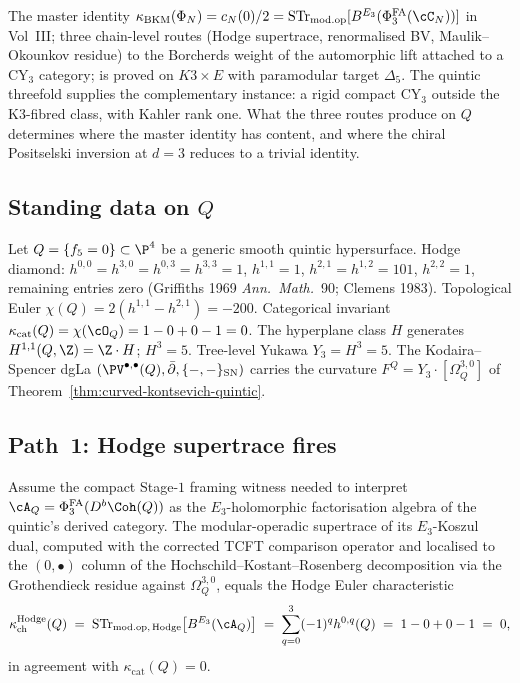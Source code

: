 The master identity $\kappa_{\mathrm{BKM}}(\Phi_N) = c_N(0)/2 =
\mathrm{STr}_{\mathrm{mod.op}}[B^{E_3}(\Phi^{\mathrm{FA}}_3(\cC_N))]$
in Vol~III; three chain-level routes (Hodge supertrace,
renormalised BV, Maulik--Okounkov residue) to the Borcherds weight of
the automorphic lift attached to a CY$_3$ category; is proved on
$K3 \times E$ with paramodular target $\Delta_5$. The quintic threefold
supplies the complementary instance: a rigid compact CY$_3$ outside the
K3-fibred class, with Kahler rank one. What the three routes produce on
$Q$ determines where the master identity has content, and where the
chiral Positselski inversion at $d = 3$ reduces to a trivial identity.

\subsection{Standing data on $Q$}
\label{subsec:quintic-standing}

Let $Q = \{f_5 = 0\} \subset \P^4$ be a generic smooth quintic hypersurface.
Hodge diamond: $h^{0,0} = h^{3,0} = h^{0,3} = h^{3,3} = 1$,
$h^{1,1} = 1$, $h^{2,1} = h^{1,2} = 101$, $h^{2,2} = 1$, remaining entries
zero (Griffiths 1969 \emph{Ann.\ Math.}~90; Clemens 1983). Topological
Euler $\chi(Q) = 2(h^{1,1} - h^{2,1}) = -200$. Categorical invariant
$\kappa_{\mathrm{cat}}(Q) = \chi(\cO_Q) = 1 - 0 + 0 - 1 = 0$. The
hyperplane class $H$ generates $H^{1,1}(Q, \Z) = \Z \cdot H$; $H^3 = 5$.
Tree-level Yukawa $Y_3 = H^3 = 5$. The Kodaira--Spencer dgLa
$(\PV^{\bullet, \bullet}(Q), \bar\partial, \{-,-\}_{\mathrm{SN}})$ carries
the curvature $F^Q = Y_3 \cdot [\Omega_Q^{3,0}]$ of
Theorem~\ref{thm:curved-kontsevich-quintic}.

\subsection{Path~1: Hodge supertrace fires}
\label{subsec:quintic-path-1-hodge}

\begin{theorem}
\label{thm:quintic-path-1-hodge}
Assume the compact Stage-$1$ framing witness needed to interpret
$\cA_Q = \Phi_3^{\mathrm{FA}}(D^b\Coh(Q))$ as the $E_3$-holomorphic
factorisation algebra of the quintic's derived category. The
modular-operadic supertrace of its $E_3$-Koszul dual, computed with the
corrected TCFT comparison operator and localised to the $(0,\bullet)$
column of the Hochschild--Kostant--Rosenberg decomposition via the
Grothendieck residue against $\Omega_Q^{3,0}$, equals the Hodge Euler
characteristic
\[
 \kappa_{\mathrm{ch}}^{\mathrm{Hodge}}(Q) \;=\;
 \mathrm{STr}_{\mathrm{mod.op},\,\mathrm{Hodge}}
 \bigl[B^{E_3}(\cA_Q)\bigr] \;=\;
 \sum_{q = 0}^{3} (-1)^q h^{0, q}(Q)
 \;=\; 1 - 0 + 0 - 1 \;=\; 0,
\]
in agreement with $\kappa_{\mathrm{cat}}(Q) = 0$.
\end{theorem}

